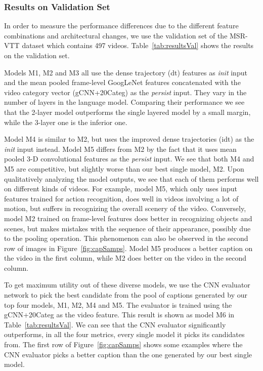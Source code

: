 \subsubsection{Results on Validation Set}
In order to measure the performance differences due to the different feature
combinations and architectural changes, we use the validation set of the MSR-VTT
dataset which contains 497 videos.
Table~\ref{tab:resultsVal} shows the results on the validation set.

Models M1, M2 and M3 all use the dense trajectory (dt) features as
\emph{init} input and the mean pooled frame-level GoogLeNet features
concatenated with the video category vector (gCNN+20Categ) as the \emph{persist}
input.
They vary in the number of layers in the language model.
Comparing their performance we see that the 2-layer model outperforms the single
layered model by a small margin, while the 3-layer one is the inferior one.

Model M4 is similar to M2, but uses the improved dense trajectories (idt) as
the \emph{init} input instead.
Model M5 differs from M2 by the fact that it uses mean pooled 3-D
convolutional features as the \emph{persist} input.
We see that both M4 and M5 are competitive, but slightly worse than our best
single model, M2.
Upon qualitatively analyzing the model outputs, we see that each of them
performs well on different kinds of videos.
For example, model M5, which only uses input features trained for action
recognition, does well in videos involving a lot of motion, but suffers in
recognizing the overall scenery of the video.
Conversely, model M2 trained on frame-level features does better in recognizing
objects and scenes, but makes mistakes with the sequence of their appearance,
possibly due to the pooling operation.
This phenomenon can also be observed in the second row of images in
Figure~\ref{fig:capSamps}. Model M5 produces a better caption on the video in
the first column, while M2 does better on the video in the second column.

To get maximum utility out of these diverse models, we use the CNN evaluator
network to pick the best candidate from the pool of captions generated by our
top four models, M1, M2, M4 and M5.
The evaluator is trained using the gCNN+20Categ as the video feature.
This result is shown as model M6 in Table~\ref{tab:resultsVal}.
We can see that the CNN evaluator significantly outperforms, in all the four
metrics, every single model it picks its candidates from.
The first row of Figure~\ref{fig:capSamps} shows some examples where the CNN
evaluator picks a better caption than the one generated by our best single
model.

